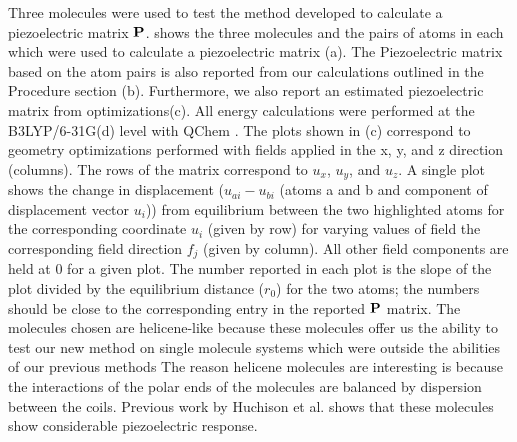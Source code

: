 Three molecules were used to test the method developed to calculate a piezoelectric matrix ${\bf{P}}$. 
 shows the three molecules and the pairs of atoms in each which were used 
to calculate a piezoelectric matrix (a).  
The Piezoelectric matrix based on the atom pairs is also reported from our calculations outlined in the Procedure section (b).  
Furthermore,
we also report an estimated piezoelectric matrix from optimizations(c).  
All energy calculations were performed at the B3LYP/6-31G(d) level with QChem \cite{Qchem}.  
The plots shown in (c) correspond to geometry optimizations performed with fields applied in the x, y, and z direction
(columns).  
The rows of the matrix correspond to $u_x$, $u_y$, and $u_z$.  
A single plot shows the change in displacement ($u_{ai} -u_{bi}$ (atoms a and b  and component of displacement vector $u_i$))
from equilibrium between the two highlighted atoms for the corresponding 
coordinate $u_i$ (given by row) for varying values of field the corresponding field direction $f_j$ (given by column).  
All other field components are held at 0 for a given plot. 
The number reported in each plot is the slope of the plot divided by the equilibrium distance ($r_0$) for the two atoms; 
the numbers should be close to the corresponding entry in the 
reported ${\bf{P}}$ matrix.  
The molecules chosen are helicene-like because these molecules offer us the ability to test our new method on single molecule systems which were outside the abilities of our previous methods
The reason helicene molecules are interesting is 
because the interactions of the polar ends of the molecules are balanced by dispersion between the coils.  
Previous work by Huchison et al. \cite{quan}
shows that these molecules show considerable piezoelectric response.  
% 
